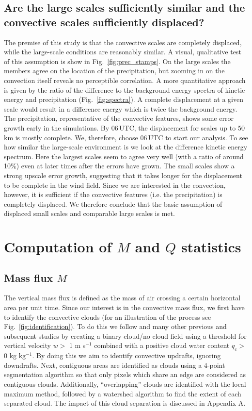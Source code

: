 \documentclass[a4paper, 12pt]{article}
\begin{document}
\subsection{Are the large scales sufficiently similar and the convective scales sufficiently displaced?} 
The premise of this study is that the convective scales are completely displaced, while the large-scale conditions are reasonably similar. A visual, qualitative test of this assumption is show in Fig.~\ref{fig:prec_stamps}. On the large scales the members agree on the location of the precipitation, but zooming in on the convection itself reveals no perceptible correlation. A more quantitative approach is given by the ratio of the difference to the background energy spectra of kinetic energy and precipitation (Fig.~\ref{fig:spectra}). A complete displacement at a given scale would result in a difference energy which is twice the background energy. The precipitation, representative of the convective features, shows some error growth early in the simulations. By 06\,UTC, the displacement for scales up to 50\,km is mostly complete. We, therefore, choose 06\,UTC to start our analysis. To see how similar the large-scale environment is we look at the difference kinetic energy spectrum. Here the largest scales seem to agree very well (with a ratio of around 10\%) even at later times after the errors have grown. The small scales show a strong upscale error growth, suggesting that it takes longer for the displacement to be complete in the wind field. Since we are interested in the convection, however, it is sufficient if the convective features (i.e. the precipitation) is completely displaced. We therefore conclude that the basic assumption of displaced small scales and comparable large scales is met.


\section{Computation of $M$ and $Q$ statistics} \label{sec:stats}

\subsection{Mass flux $M$}
The vertical mass flux is defined as the mass of air crossing a certain horizontal area per unit time. Since our interest is in the convective mass flux, we first have to identify the convective clouds (for an illustration of the process see Fig.~\ref{fig:identification}). To do this we follow \cite{Cohen2006} and many other previous and subsequent studies by creating a binary cloud/no cloud field using a threshold for vertical velocity $w >$ 1 m s$^{-1}$ combined with a positive cloud water content $q_c >$ 0 kg kg$^{-1}$. By doing this we aim to identify convective updrafts, ignoring downdrafts. Next, contiguous areas are identified as clouds using a 4-point segmentation algorithm so that only pixels which share an edge are considered as contiguous clouds. Additionally, ``overlapping'' clouds are identified with the local maximum method, followed by a watershed algorithm to find the extent of each separated cloud. The impact of this cloud separation is discussed in Appendix A.
\end{document}
